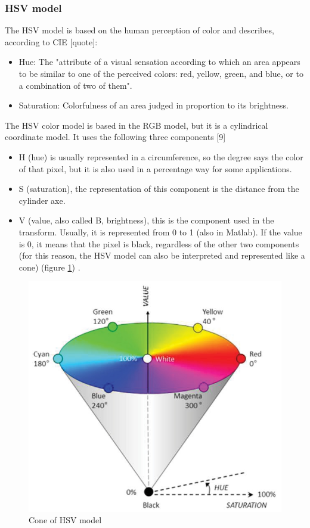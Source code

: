 \subsubsection{HSV model}
The HSV model is based on the human perception of color and describes, according to CIE [quote]:
\begin{itemize}
	\item Hue: The "attribute of a visual sensation according to which an area appears to be similar to one of the perceived colors: red, yellow, green, and blue, or to a combination of two of them".
	\item Saturation: Colorfulness of an area judged in proportion to its brightness.
\end{itemize}
The HSV color model is based in the RGB model, but it is a cylindrical coordinate model. It uses the following three components [9]

\begin{itemize}
	\item H (hue) is usually represented in a circumference, so the degree says the color of that pixel, but it is also used in a percentage way for some applications.
	\item S (saturation), the representation of this component is the distance from the cylinder axe.
	\item V (value, also called B, brightness), this is the component used in the transform. Usually, it is represented from 0 to 1 (also in Matlab). If the value is 0, it means that the pixel is black, regardless of the other two components (for this reason, the HSV model can also be interpreted and represented like a cone) (figure \ref{fig:HSVModel}) \cite{dip4}.

\end{itemize}

\begin{figure}
	\centering
  	\includegraphics[scale=0.5]{images/ch2/HSVModel.jpg}
  	\caption{Cone of HSV model}
  	\label{fig:HSVModel}
\end{figure}

